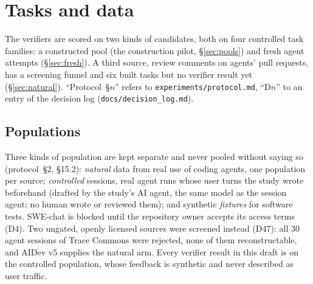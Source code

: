 \section{Tasks and data}
\label{sec:data}
The verifiers are scored on two kinds of candidates, both on four controlled task families: a constructed pool (the construction pilot, \S\ref{sec:pools}) and fresh agent attempts (\S\ref{sec:fresh}). A third source, review comments on agents' pull requests, has a screening funnel and six built tasks but no verifier result yet (\S\ref{sec:natural}). ``Protocol~\S$n$'' refers to \texttt{experiments/protocol.md}, ``D$n$'' to an entry of the decision log (\texttt{docs/decision\_log.md}).

\subsection{Populations}
\label{sec:populations}
Three kinds of population are kept separate and never pooled without saying so (protocol~\S2, \S15.2): \emph{natural} data from real use of coding agents, one population per source; \emph{controlled} sessions, real agent runs whose user turns the study wrote beforehand (drafted by the study's AI agent, the same model as the session agent; no human wrote or reviewed them); and synthetic \emph{fixtures} for software tests. SWE-chat \cite{swechat} is blocked until the repository owner accepts its access terms (D4). Two ungated, openly licensed sources were screened instead (D47): all 30 agent sessions of Trace Commons \cite{tracecommons2026trace} were rejected, none of them reconstructable, and AIDev v5 \cite{li2025rise,li2026aidev,haoli2025aidev} supplies the natural arm. Every verifier result in this draft is on the controlled population, whose feedback is synthetic and never described as user traffic.

